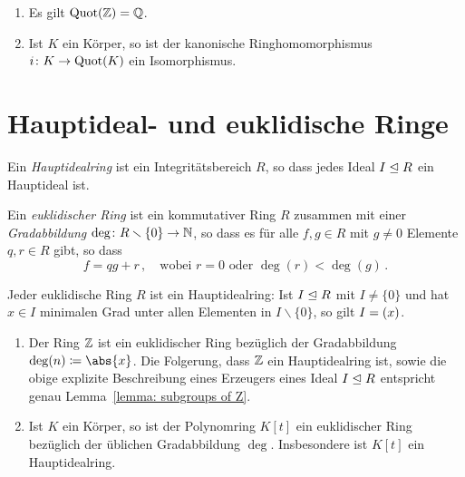 \begin{example}
  \begin{enumerate}
    \item
      Es gilt $\operatorname{Quot}(\mathbb{Z}) = \mathbb{Q}$.
    \item
      Ist $K$ ein Körper, so ist der kanonische Ringhomomorphismus $i \colon K \to \operatorname{Quot}(K)$ ein Isomorphismus.
  \end{enumerate}
\end{example}









\section{Hauptideal- und euklidische Ringe}

\begin{definition}
  Ein \emph{Hauptidealring} ist ein Integritätsbereich $R$, so dass jedes Ideal $I \mathrel{\trianglelefteq} R$ ein Hauptideal ist.
\end{definition}

\begin{definition}
  Ein \emph{euklidischer Ring} ist ein kommutativer Ring $R$ zusammen mit einer \emph{Gradabbildung} $\deg \colon R \smallsetminus \{0\} \to \mathbb{N}$, so dass es für alle $f, g \in R$ mit $g \neq 0$ Elemente $q, r \in R$ gibt, so dass
  \[
    f = qg + r \,,
    \quad
    \text{wobei $r = 0$ oder $\deg(r) < \deg(g)$} \,.
  \]
\end{definition}

\begin{lemma}
  Jeder euklidische Ring $R$ ist ein Hauptidealring:
  Ist $I \mathrel{\trianglelefteq} R$ mit $I \neq \{0\}$ und hat $x \in I$ minimalen Grad unter allen Elementen in $I \smallsetminus \{0\}$, so gilt $I = (x)$.
\end{lemma}

\begin{example}
  \begin{enumerate}
    \item
      Der Ring $\mathbb{Z}$ ist ein euklidischer Ring bezüglich der Gradabbildung $\deg(n) \defined \abs{x}$.
      Die Folgerung, dass $\mathbb{Z}$ ein Hauptidealring ist, sowie die obige explizite Beschreibung eines Erzeugers eines Ideal $I \mathrel{\trianglelefteq} R$ entspricht genau Lemma~\ref{lemma: subgroups of Z}.
    \item
      Ist $K$ ein Körper, so ist der Polynomring $K[t]$ ein euklidischer Ring bezüglich der üblichen Gradabbildung $\deg$.
      Insbesondere ist $K[t]$ ein Hauptidealring.
  \end{enumerate}
\end{example}

